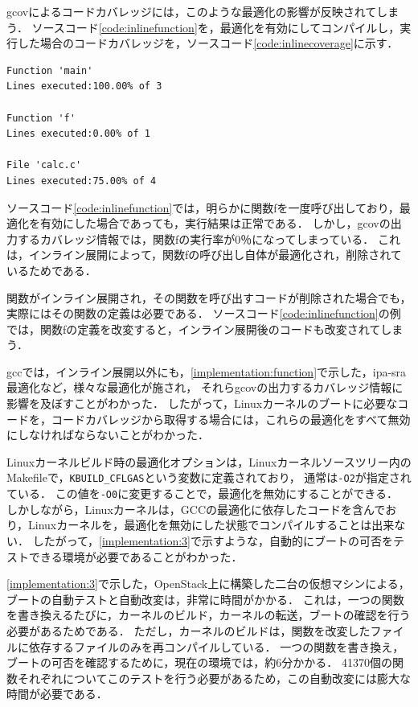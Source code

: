 \documentclass[graduation-thesis]{mlarticle}
\begin{document}
gcovによるコードカバレッジには，このような最適化の影響が反映されてしまう．
ソースコード\ref{code:inlinefunction}を，最適化を有効にしてコンパイルし，実行した場合のコードカバレッジを，ソースコード\ref{code:inlinecoverage}に示す．

\begin{lstlisting}[caption=最適化を有効にした場合のgcovの出力, label=code:inlinecoverage]
Function 'main'
Lines executed:100.00% of 3

Function 'f'
Lines executed:0.00% of 1

File 'calc.c'
Lines executed:75.00% of 4
\end{lstlisting}

ソースコード\ref{code:inlinefunction}では，明らかに関数fを一度呼び出しており，最適化を有効にした場合であっても，実行結果は正常である．
しかし，gcovの出力するカバレッジ情報では，関数fの実行率が0％になってしまっている．
これは，インライン展開によって，関数fの呼び出し自体が最適化され，削除されているためである．

関数がインライン展開され，その関数を呼び出すコードが削除された場合でも，実際にはその関数の定義は必要である．
ソースコード\ref{code:inlinefunction}の例では，関数fの定義を改変すると，インライン展開後のコードも改変されてしまう．

gccでは，インライン展開以外にも，\ref{implementation:function}で示した，ipa-sra最適化など，様々な最適化が施され，
それらgcovの出力するカバレッジ情報に影響を及ぼすことがわかった．
したがって，Linuxカーネルのブートに必要なコードを，コードカバレッジから取得する場合には，これらの最適化をすべて無効にしなければならないことがわかった．

Linuxカーネルビルド時の最適化オプションは，Linuxカーネルソースツリー内のMakefileで，\texttt{KBUILD\_CFLGAS}という変数に定義されており，
通常は\texttt{-O2}が指定されている．
この値を\texttt{-O0}に変更することで，最適化を無効にすることができる．
しかしながら，Linuxカーネルは，GCCの最適化に依存したコードを含んでおり，Linuxカーネルを，最適化を無効にした状態でコンパイルすることは出来ない．
したがって，\ref{implementation:3}で示すような，自動的にブートの可否をテストできる環境が必要であることがわかった．

\ref{implementation:3}で示した，OpenStack上に構築した二台の仮想マシンによる，ブートの自動テストと自動改変は，非常に時間がかかる．
これは，一つの関数を書き換えるたびに，カーネルのビルド，カーネルの転送，ブートの確認を行う必要があるためである．
ただし，カーネルのビルドは，関数を改変したファイルに依存するファイルのみを再コンパイルしている．
一つの関数を書き換え，ブートの可否を確認するために，現在の環境では，約6分かかる．
41370個の関数それぞれについてこのテストを行う必要があるため，この自動改変には膨大な時間が必要である．
\end{document}
